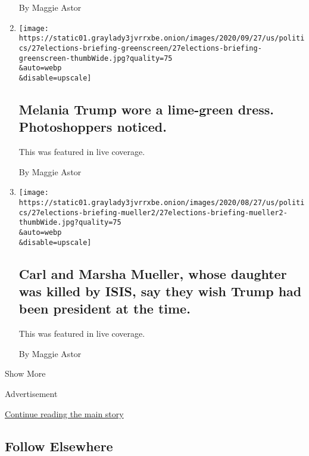 \begin{enumerate}
  By Maggie Astor
\item
  \href{/live/2020/08/27/us/rnc-convention-election/melania-trump-wore-a-lime-green-dress-photoshoppers-noticed}{}

  \texttt{[image: https://static01.graylady3jvrrxbe.onion/images/2020/09/27/us/politics/27elections-briefing-greenscreen/27elections-briefing-greenscreen-thumbWide.jpg?quality=75\\\&auto=webp\\\&disable=upscale]}

  \hypertarget{melania-trump-wore-a-lime-green-dress-photoshoppers-noticed}{%
  \subsection{Melania Trump wore a lime-green dress. Photoshoppers
  noticed.}\label{melania-trump-wore-a-lime-green-dress-photoshoppers-noticed}}

  This was featured in live coverage.

  By Maggie Astor
\item
  \href{/live/2020/08/27/us/rnc-convention-election/carl-and-marsha-mueller-whose-daughter-was-killed-by-isis-say-they-wish-trump-had-been-president-at-the-time}{}

  \texttt{[image: https://static01.graylady3jvrrxbe.onion/images/2020/08/27/us/politics/27elections-briefing-mueller2/27elections-briefing-mueller2-thumbWide.jpg?quality=75\\\&auto=webp\\\&disable=upscale]}

  \hypertarget{carl-and-marsha-mueller-whose-daughter-was-killed-by-isis-say-they-wish-trump-had-been-president-at-the-time}{%
  \subsection{Carl and Marsha Mueller, whose daughter was killed by
  ISIS, say they wish Trump had been president at the
  time.}\label{carl-and-marsha-mueller-whose-daughter-was-killed-by-isis-say-they-wish-trump-had-been-president-at-the-time}}

  This was featured in live coverage.

  By Maggie Astor
\end{enumerate}

Show More

Advertisement

\protect\hyperlink{after-mid2}{Continue reading the main story}

\hypertarget{follow-elsewhere}{%
\subsection{Follow Elsewhere}\label{follow-elsewhere}}


